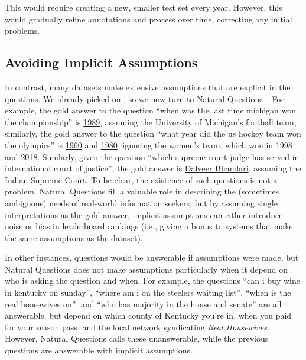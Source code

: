 This would require creating a new, smaller test set every year.
However, this would gradually refine annotations and process over time, correcting any initial problems.

\subsection{Avoiding Implicit Assumptions}

In contrast, many datasets make extensive assumptions that are explicit in the questions.
We already picked on \squad{}, so we now turn to Natural Questions~\cite{kwiatkowski-19}.
For example, the gold answer to the question ``when was the last time michigan won the championship'' is \underline{1989}, assuming the University of Michigan's football team; similarly, the gold answer to the question ``what year did the us hockey team won the olympics'' is \underline{1960} and \underline{1980}, ignoring the  women's team, which won in 1998 and 2018.
Similarly, given the question ``which supreme court judge has served in international court of justice'', the gold answer is \underline{Dalveer Bhandari}, assuming the Indian Supreme Court.
To be clear, the existence of such questions is not a problem.
Natural Questions fill a valuable role in describing the (sometimes ambiguous) needs of real-world information seekers, but by assuming single interpretations as the gold answer, implicit assumptions can either introduce noise or bias in leaderboard rankings (i.e., giving a bonus to systems that make the same assumptions as the dataset).


In other instances, questions would be answerable if assumptions were made, but Natural Questions does not make assumptions particularly when it depend on who is asking the question and when.
For example, the questions ``can i buy wine in kentucky on sunday'', ``where am i on the steelers waiting list'', ``when is the real housewives on'', and ``who has majority in the house and senate'' are all answerable, but depend on which county of Kentucky you're in,
  when you paid for your season pass, and the local network
  syndicating \textit{Real Housewives}.
However, Natural Questions calls these unanswerable, while the previous questions are answerable with implicit assumptions.

